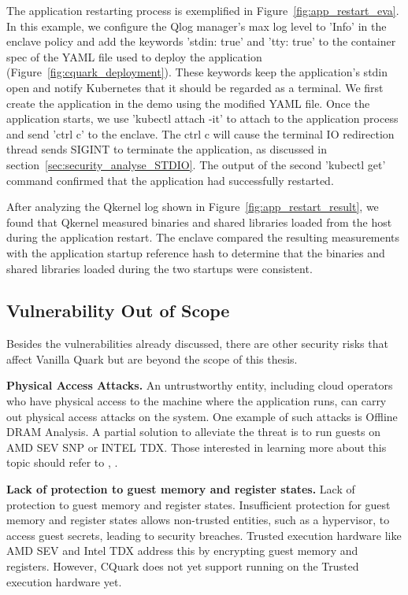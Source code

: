 The application restarting process is exemplified in Figure~\ref{fig:app_restart_eva}. In this example, we configure the Qlog manager’s max log level to ’Info’ in the enclave policy and add the keywords ’stdin: true’ and ’tty: true’ to the container spec of the YAML file used to deploy the 
application (Figure~\ref{fig:cquark_deployment}). These keywords keep the application’s stdin open and notify Kubernetes that it should be regarded as a terminal. We first create the application in the demo using the modified YAML file. Once the application starts, we use ’kubectl attach -it’ to 
attach to the application process and send ’ctrl c’ to the enclave. The ctrl c will cause the terminal IO redirection thread sends SIGINT to terminate the application, as discussed in section~\ref{sec:security_analyse_STDIO}. The output of the second ’kubectl get’ command confirmed that the application had successfully restarted. 

After analyzing the Qkernel log shown in Figure~\ref{fig:app_restart_result}, we found that Qkernel measured binaries and shared libraries loaded from the host during the application restart. The enclave compared the resulting measurements with the application startup reference hash to determine that the binaries and shared libraries loaded during the two startups were 
consistent.

\subsection{Vulnerability Out of Scope}
Besides the vulnerabilities already discussed, there are other security risks that affect Vanilla Quark but are beyond the scope of this thesis.



\textbf{Physical Access Attacks.} An untrustworthy entity, including cloud operators who have physical access to the machine where the application runs, can carry out physical access attacks on the system. One example of such attacks 
is Offline DRAM Analysis. A partial solution to alleviate the threat is to run guests on AMD SEV SNP or INTEL TDX.  Those interested in learning more about this topic should refer to \cite*{SEV_SNP_white_book}, \cite*{DBLP:journals/corr/abs-2303-15540}.


\textbf{Lack of protection to guest memory and register states.} Lack of protection to guest memory and register states.  Insufficient protection for guest memory and register states allows non-trusted entities, such as a hypervisor, to access guest secrets, leading to security breaches. 
Trusted execution hardware like AMD SEV\cite*{SEV_SNP_white_book} and Intel TDX\cite*{Intel_tdx_whitepaper} address this by encrypting guest memory and registers. However, CQuark does not yet support running on the Trusted execution hardware yet.


